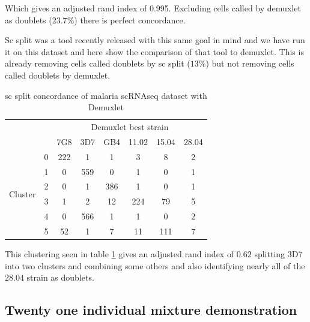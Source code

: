 Which gives an adjusted rand index of 0.995. Excluding cells called by demuxlet as doublets ($23.7\%$) there is perfect concordance. 

Sc split \cite{sc_split} was a tool recently released with this same goal in mind and we have run it on this dataset and here show the comparison 
of that tool to demuxlet. This is already removing cells called doublets by sc split ($13\%$) but not removing cells called doublets by demuxlet.

\begin{table}[h!]
\begin{center}
\caption{sc split concordance of malaria scRNAseq dataset with Demuxlet}
\label{table:scsplitmalaria}
\begin{tabular}{ | c | c | c | c | c | c | c | c |} 
\hline
\multicolumn{2}{|c|}{} & \multicolumn{6}{c|}{Demuxlet best strain} \\
\cline{3-8}
\multicolumn{2}{|c|}{} & 7G8 & 3D7 & GB4 & 11.02 & 15.04 & 28.04 \\
\hline
\multirow{6}{4em}{Cluster} & 0 & 222 & 1 & 1 & 3 & 8 & 2 \\
					 \cline{2-8}
                                           & 1 & 0 & 559 &  0 & 1 & 0 & 1 \\
                                           \cline{2-8}
                                           & 2 & 0 & 1 & 386 & 1 & 0 & 1 \\
                                           \cline{2-8}
                                           & 3 & 1 & 2 & 12 & 224 & 79 & 5 \\
                                          \cline{2-8}
                                           & 4 & 0 & 566 &1  & 1 & 0 & 2 \\
                                           \cline{2-8}
                                           & 5 & 52 & 1 & 7 & 11 & 111 & 7 \\
                                           \hline
\end{tabular}
\end{center}
\end{table}

This clustering seen in table \ref{table:scsplitmalaria} gives an adjusted rand index of $0.62$ splitting 3D7 into two clusters and combining some others and also identifying nearly all of the $28.04$ strain as doublets.


\subsection{Twenty one individual mixture demonstration}
